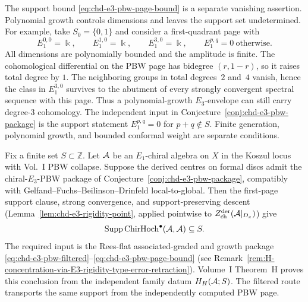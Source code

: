 \begin{remark}
\label{rem:chd-e3-pbw-page-support-independent}
The support bound \eqref{eq:chd-e3-pbw-page-bound} is a separate
vanishing assertion.  Polynomial growth controls dimensions and leaves
the support set undetermined.  For example, take
$S_0=\{0,1\}$ and consider a first-quadrant page with
\[
 E_1^{0,0}=\Bbbk,\qquad
 E_1^{1,0}=\Bbbk,\qquad
 E_1^{3,0}=\Bbbk,
 \qquad
 E_1^{p,q}=0\ \text{otherwise}.
\]
All dimensions are polynomially bounded and the amplitude is finite.
The cohomological differential on the PBW page has bidegree
\((r,1-r)\), so it raises total degree by \(1\). The neighboring groups
in total degrees~\(2\) and~\(4\) vanish, hence the class in
\(E_1^{3,0}\) survives to the abutment of every strongly convergent
spectral sequence with this page. Thus a
polynomial-growth \(E_3\)-envelope can still carry degree-\(3\)
cohomology. The independent input in
Conjecture~\ref{conj:chd-e3-pbw-package} is the support statement
\(E_1^{p,q}=0\) for \(p+q\notin S\). Finite generation, polynomial
growth, and bounded conformal weight are separate conditions.
\end{remark}

\begin{conjecture}%
\label{conj:H-concentration-via-E3-rigidity}%
%
Fix a finite set $S\subset\mathbb Z$.  Let $\mathcal{A}$ be an $E_1$-chiral
algebra on $X$ in the Koszul locus with Vol.~I PBW collapse. Suppose
the derived centres on formal discs admit
the chiral-$E_3$-PBW package of
Conjecture~\ref{conj:chd-e3-pbw-package}, compatibly with
Gelfand--Fuchs--Beilinson--Drinfeld local-to-global. Then the
first-page support clause, strong convergence, and support-preserving
descent (Lemma~\ref{lem:chd-e3-rigidity-point}, applied pointwise to
$Z^{\mathrm{der}}_{\mathrm{ch}}(\mathcal{A}|_{D_x})$) give
\[
 \operatorname{Supp}\mathrm{ChirHoch}^\bullet(\mathcal{A},\mathcal{A})\subseteq S.
\]
The required input is the Rees-flat associated-graded and growth package
\eqref{eq:chd-e3-pbw-filtered}--\eqref{eq:chd-e3-pbw-page-bound} (see
Remark~\ref{rem:H-concentration-via-E3-rigidity-type-error-retraction}).
Volume~I Theorem~H proves this conclusion from the independent family
datum $H_H(\mathcal{A};S)$. The filtered route transports the same support
from the independently computed PBW page.
\end{conjecture}

